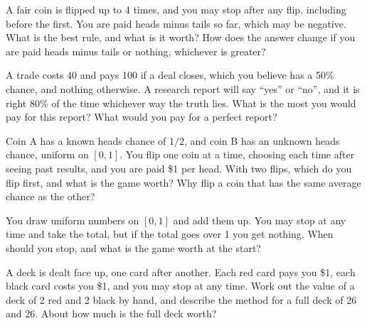 \begin{question}\label{iq:iv1:optimal-stopping:10}
A fair coin is flipped up to 4 times, and you may stop after any flip, including before the first. You are paid heads minus tails so far, which may be negative. What is the best rule, and what is it worth? How does the answer change if you are paid heads minus tails or nothing, whichever is greater?
\end{question}

\begin{question}\label{iq:iv1:optimal-stopping:11}
A trade costs 40 and pays 100 if a deal closes, which you believe has a 50\% chance, and nothing otherwise. A research report will say ``yes'' or ``no'', and it is right 80\% of the time whichever way the truth lies. What is the most you would pay for this report? What would you pay for a perfect report?
\end{question}

\begin{question}\label{iq:iv1:optimal-stopping:12}
Coin A has a known heads chance of $1/2$, and coin B has an unknown heads chance, uniform on $[0, 1]$. You flip one coin at a time, choosing each time after seeing past results, and you are paid \$1 per head. With two flips, which do you flip first, and what is the game worth? Why flip a coin that has the same average chance as the other?
\end{question}

\begin{question}\label{iq:iv1:optimal-stopping:13}
You draw uniform numbers on $[0, 1]$ and add them up. You may stop at any time and take the total, but if the total goes over 1 you get nothing. When should you stop, and what is the game worth at the start?
\end{question}

\begin{question}\label{iq:iv1:optimal-stopping:14}
A deck is dealt face up, one card after another. Each red card pays you \$1, each black card costs you \$1, and you may stop at any time. Work out the value of a deck of 2 red and 2 black by hand, and describe the method for a full deck of 26 and 26. About how much is the full deck worth?
\end{question}

